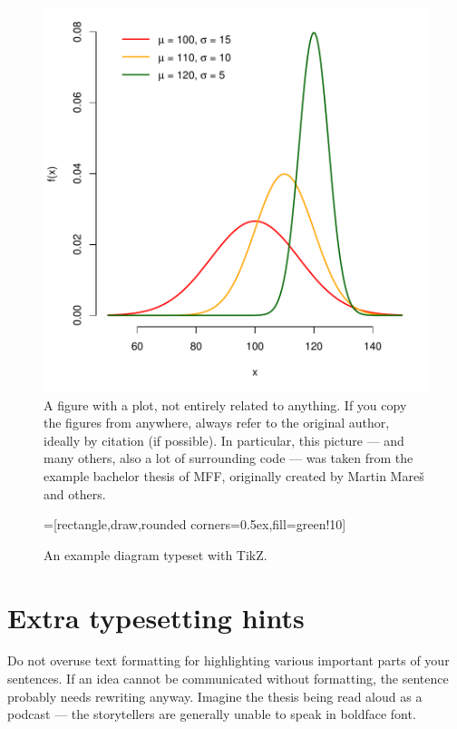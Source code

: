 \begin{figure}
\centering
\includegraphics[width=.6\linewidth]{img/ukazka-obr02.pdf}
\caption{A figure with a plot, not entirely related to anything. If you copy the figures from anywhere, always refer to the original author, ideally by citation (if possible). In particular, this picture --- and many others, also a lot of surrounding code --- was taken from the example bachelor thesis of MFF, originally created by Martin Mareš and others.}
\label{fig:g}
\end{figure}

\begin{figure}
\centering
{}=[rectangle,draw,rounded corners=0.5ex,fill=green!10]
\caption{An example diagram typeset with TikZ.}
\end{figure}


\section{Extra typesetting hints}

Do not overuse text formatting for highlighting various important parts of your sentences. If an idea cannot be communicated without formatting, the sentence probably needs rewriting anyway. Imagine the thesis being read aloud as a podcast --- the storytellers are generally unable to speak in boldface font.

